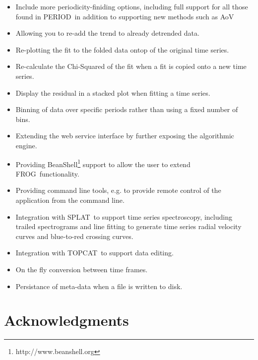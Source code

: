 \documentclass[twoside,11pt]{article}
\newcommand{\htmladdnormallinkfoot}[2]{#1\footnote{#2}}
\newcommand{\xlabel}[1]{}
\renewcommand{\_}{\texttt{\symbol{95}}}
\newcommand{\FROG}{\textsf{FROG}}
\newcommand{\SPLAT}{\textsf{SPLAT}}
\newcommand{\TOPCAT}{\textsf{TOPCAT}}
\newcommand{\PERIOD}{\textsf{PERIOD}}
\begin{document}
\begin{itemize}

\item Include more periodicity-finiding options, including full support for all those found in \PERIOD\, in addition to supporting new methods such as AoV

\item Allowing you to re-add the trend to already detrended data.

\item Re-plotting the fit to the folded data ontop of the original time series. 

\item Re-calculate the Chi-Squared of the fit when a fit is copied onto a new time series.

\item Display the residual in a stacked plot when fitting a time series.
 
\item Binning of data over specific periods rather than using a fixed number of bins.

\item Extending the web service interface by further exposing the algorithmic engine.

\item Providing \htmladdnormallinkfoot{BeanShell}{http://www.beanshell.org} support to allow the user to extend \FROG\ functionality.

\item Providing command line tools, e.g. to provide remote control of the application from the command line.

\item Integration with \SPLAT\ to support time series spectroscopy, including trailed spectrograms and line fitting to generate time series radial velocity curves and blue-to-red crossing curves.

\item Integration with \TOPCAT\ to support data editing.

\item On the fly conversion between time frames.

\item Persistance of meta-data when a file is written to disk.

\end{itemize}

\section{Acknowledgments\xlabel{acknowledgements}}
\end{document}
